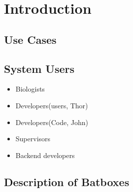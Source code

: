 \section{Introduction}

\subsection{Use Cases}



\subsection{System Users}

\begin{itemize}
	\item Biologists
	\item Developers(users, Thor)
	\item Developers(Code, John)
	\item Supervisors
	\item Backend developers
\end{itemize}

\subsection{Description of Batboxes}
